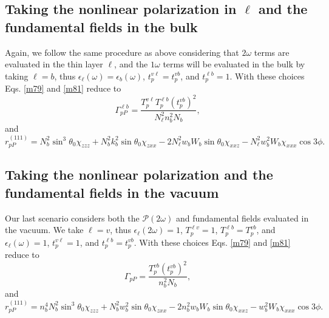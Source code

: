 

\subsection{Taking the nonlinear polarization in \texorpdfstring{$\ell$}{l} and
the fundamental fields in the bulk}\label{sec:hybrid}

Again, we follow the same procedure as above considering that $2\omega$ terms
are evaluated in the thin layer $\ell$, and the $1\omega$ terms will be
evaluated in the bulk by taking $\ell = b$, thus
$\epsilon_{\ell}(\omega)=\epsilon_{b}(\omega)$, $t^{v\ell}_{p} = t^{vb}_{p}$,
and $t^{\ell b}_{p} = 1$. With these choices Eqs. \eqref{m79} and \eqref{m81}
reduce to
\begin{equation}
\Gamma^{\ell b}_{pP}=
\frac{T^{v\ell}_{p}T^{\ell b}_{p}\left(t^{vb}_{p}\right)^{2}}
  {N^{2}_{\ell}n^{2}_{b}N_{b}}
,
\end{equation}
and
\begin{equation}
r^{(111)}_{pP} = 
  N^{2}_{b}\sin^{3}\theta_{0}\chi_{zzz}
+ N^{2}_{b}k^{2}_{b}\sin\theta_{0}\chi_{zxx}
- 2N^{2}_{\ell}w_{b}W_{b}\sin\theta_{0}\chi_{xxz}
- N^{2}_{\ell}w^{2}_{b}W_{b}\chi_{xxx}\cos3\phi.
\end{equation}



\subsection{Taking the nonlinear polarization and the fundamental fields in the
vacuum}\label{sec:vacuum}

Our last scenario considers both the $\boldsymbol{\mathcal{P}}(2\omega)$ and
fundamental fields evaluated in the vacuum. We take $\ell = v$, thus
$\epsilon_{\ell}(2\omega)=1$, $T^{\ell v}_{p}=1$, $T^{\ell b}_{p} = T^{vb}_{p}$,
and $\epsilon_{\ell}(\omega) = 1$, $t^{v\ell}_{p} = 1$, and $t^{\ell b}_{p} =
t^{vb}_{p}$. With these choices Eqs. \eqref{m79} and \eqref{m81} reduce to
\begin{equation}
\Gamma_{pP} =
\frac{T^{v b}_{p}\left(t^{v b}_{p}\right)^{2}}
     {n^{2}_{b}N_{b}}
,
\end{equation}
and
\begin{equation}
r^{(111)}_{pP} =
  n^{4}_{b}N^{2}_{b}\sin^{3}\theta_{0}\chi_{zzz}
+ N^{2}_{b}w^{2}_{b}\sin\theta_{0}\chi_{zxx}
- 2n^{2}_{b}w_{b}W_{b}\sin\theta_{0}\chi_{xxz}
- w^{2}_{b}W_{b}\chi_{xxx}\cos3\phi.
\end{equation}

